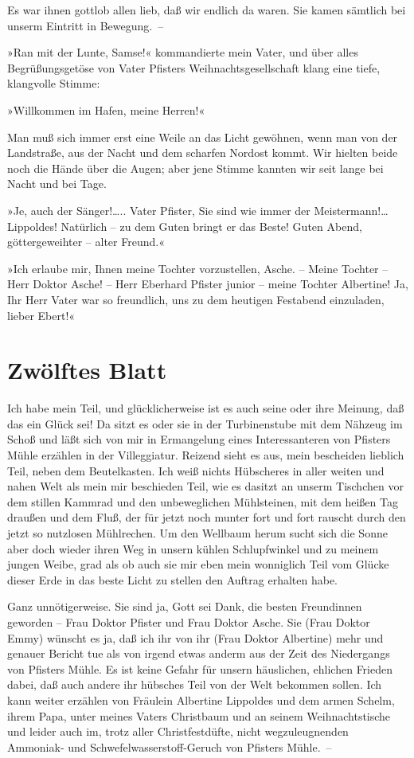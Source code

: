 Es war ihnen gottlob allen lieb, daß wir endlich da waren. Sie
kamen sämtlich bei unserm Eintritt in Bewegung.~–

»Ran mit der Lunte, Samse!« kommandierte mein Vater, und über alles
Begrüßungsgetöse von Vater Pfisters Weihnachtsgesellschaft klang
eine tiefe, klangvolle Stimme:

»Willkommen im Hafen, meine Herren!«

Man muß sich immer erst eine Weile an das Licht gewöhnen, wenn man
von der Landstraße, aus der Nacht und dem scharfen Nordost kommt.
Wir hielten beide noch die Hände über die Augen; aber jene Stimme
kannten wir seit lange bei Nacht und bei Tage.

»Je, auch der Sänger!\ldots{}.. Vater Pfister, Sie sind wie immer der
Meistermann!\ldots{} Lippoldes! Natürlich – zu dem Guten bringt er das
Beste! Guten Abend, göttergeweihter – alter Freund.«

»Ich erlaube mir, Ihnen meine Tochter vorzustellen, Asche. – Meine
Tochter – Herr Doktor Asche! – Herr Eberhard Pfister junior – meine
Tochter Albertine! Ja, Ihr Herr Vater war so freundlich, uns zu dem
heutigen Festabend einzuladen, lieber Ebert!«

\section{Zwölftes Blatt}

Ich habe mein Teil, und glücklicherweise ist es auch seine oder
ihre Meinung, daß das ein Glück sei! Da sitzt es oder sie in der
Turbinenstube mit dem Nähzeug im Schoß und läßt sich von mir in
Ermangelung eines Interessanteren von Pfisters Mühle erzählen in
der Villeggiatur. Reizend sieht es aus, mein bescheiden lieblich
Teil, neben dem Beutelkasten. Ich weiß nichts Hübscheres in aller
weiten und nahen Welt als mein mir beschieden Teil, wie es dasitzt
an unserm Tischchen vor dem stillen Kammrad und den unbeweglichen
Mühlsteinen, mit dem heißen Tag draußen und dem Fluß, der für jetzt
noch munter fort und fort rauscht durch den jetzt so nutzlosen
Mühlrechen. Um den Wellbaum herum sucht sich die Sonne aber doch
wieder ihren Weg in unsern kühlen Schlupfwinkel und zu meinem
jungen Weibe, grad als ob auch sie mir eben mein wonniglich Teil
vom Glücke dieser Erde in das beste Licht zu stellen den Auftrag
erhalten habe.

Ganz unnötigerweise. Sie sind ja, Gott sei Dank, die besten
Freundinnen geworden – Frau Doktor Pfister und Frau Doktor Asche.
Sie (Frau Doktor Emmy) wünscht es ja, daß ich ihr von ihr (Frau
Doktor Albertine) mehr und genauer Bericht tue als von irgend etwas
anderm aus der Zeit des Niedergangs von Pfisters Mühle. Es ist
keine Gefahr für unsern häuslichen, ehlichen Frieden dabei, daß
auch andere ihr hübsches Teil von der Welt bekommen sollen. Ich
kann weiter erzählen von Fräulein Albertine Lippoldes und dem armen
Schelm, ihrem Papa, unter meines Vaters Christbaum und an seinem
Weihnachtstische und leider auch im, trotz aller Christfestdüfte,
nicht wegzuleugnenden Ammoniak- und Schwefelwasserstoff-Geruch von
Pfisters Mühle.~–

